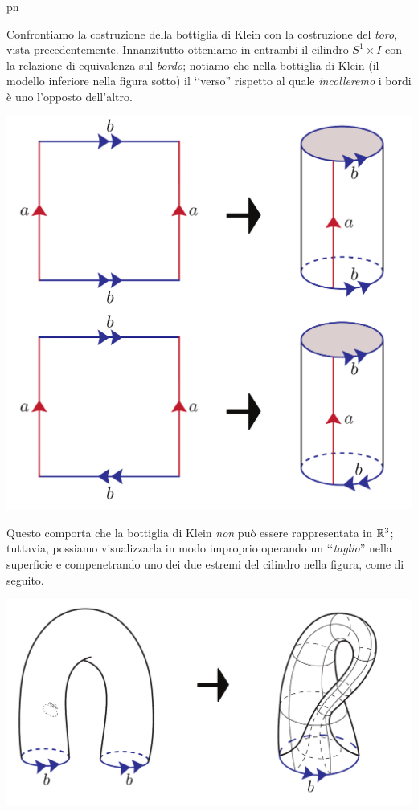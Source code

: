 \begin{example}{pn}
\begin{itemize}
\begin{center}
		\end{center}
		Confrontiamo la costruzione della bottiglia di Klein con la costruzione del \textit{toro}, vista precedentemente. Innanzitutto otteniamo in entrambi il cilindro $S^1\times I$ con la relazione di equivalenza sul \textit{bordo}; notiamo che nella bottiglia di Klein (il modello inferiore nella figura sotto) il ‘‘verso'' rispetto al quale \textit{incolleremo} i bordi è uno l'opposto dell'altro.
		\begin{center}
			\includegraphics[trim=0cm 0cm 0cm 0cm, clip, scale=0.375]{images/kleintorus.pdf}
		\end{center}
	Questo comporta che la bottiglia di Klein \textit{non} può essere rappresentata in $\mathbb{R}^3$; tuttavia, possiamo visualizzarla in modo improprio operando un ‘‘\textit{taglio}'' nella superficie e compenetrando uno dei due estremi del cilindro nella figura, come di seguito.
	 \begin{center}
	 	\includegraphics[trim=0cm 0cm 0cm 0cm, clip, scale=0.375]{images/kleinconstruction.pdf}
	 \end{center}
	\end{itemize}
\end{example}


